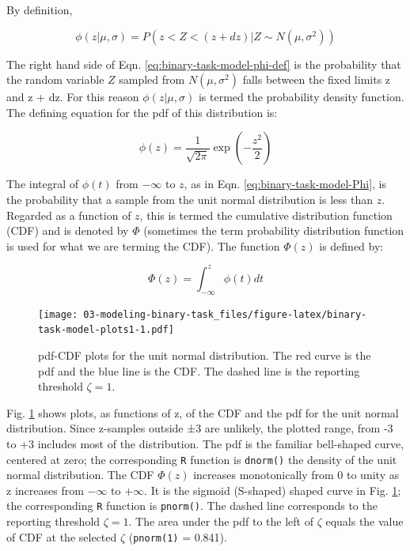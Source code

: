 \documentclass[
]{book}
\begin{document}
By definition,

\begin{equation} 
\phi\left ( z|\mu,\sigma \right )=P(z<Z<(z+dz)|Z \sim N(\mu,\sigma^2))
\label{eq:binary-task-model-phi-def}
\end{equation}

The right hand side of Eqn. \eqref{eq:binary-task-model-phi-def} is the probability that the random variable \(Z\) sampled from \(N(\mu,\sigma^2)\) falls between the fixed limits z and z + dz. For this reason \(\phi(z|\mu,\sigma)\) is termed the probability density function. The defining equation for the pdf of this distribution is:

\begin{equation} 
\phi\left ( z \right )=\frac{1}{\sqrt{2\pi}}\exp\left ( -\frac{z^2}{2} \right )
\label{eq:binary-task-model-phi}
\end{equation}

The integral of \(\phi(t)\) from \(-\infty\) to \(z\), as in Eqn. \eqref{eq:binary-task-model-Phi}, is the probability that a sample from the unit normal distribution is less than \(z\). Regarded as a function of \(z\), this is termed the cumulative distribution function (CDF) and is denoted by \(\Phi\) (sometimes the term probability distribution function is used for what we are terming the CDF). The function \(\Phi(z)\) is defined by:

\begin{equation} 
\Phi\left ( z \right )=\int_{-\infty }^{z}\phi(t)dt
\label{eq:binary-task-model-Phi}
\end{equation}

\begin{figure}
\centering
\texttt{[image: 03-modeling-binary-task\_files/figure-latex/binary-task-model-plots1-1.pdf]}
\caption{\label{fig:binary-task-model-plots1}pdf-CDF plots for the unit normal distribution. The red curve is the pdf and the blue line is the CDF. The dashed line is the reporting threshold \(\zeta = 1\).}
\end{figure}

Fig. \ref{fig:binary-task-model-plots1} shows plots, as functions of z, of the CDF and the pdf for the unit normal distribution. Since z-samples outside ±3 are unlikely, the plotted range, from -3 to +3 includes most of the distribution. The pdf is the familiar bell-shaped curve, centered at zero; the corresponding \texttt{R} function is \texttt{dnorm()} the density of the unit normal distribution. The CDF \(\Phi(z)\) increases monotonically from 0 to unity as z increases from \(-\infty\) to \(+\infty\). It is the sigmoid (S-shaped) shaped curve in Fig. \ref{fig:binary-task-model-plots1}; the corresponding \texttt{R} function is \texttt{pnorm()}. The dashed line corresponds to the reporting threshold \(\zeta = 1\). The area under the pdf to the left of \(\zeta\) equals the value of CDF at the selected \(\zeta\) (\texttt{pnorm(1)} = 0.841).
\end{document}
